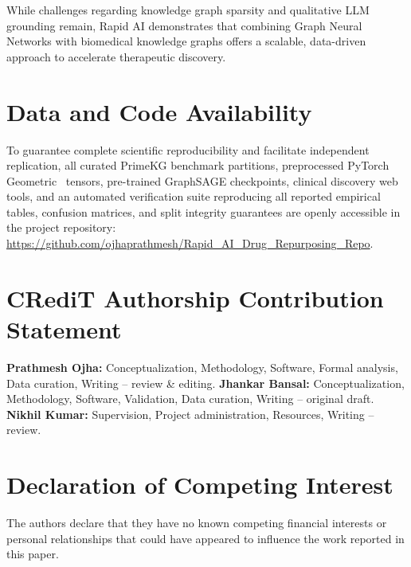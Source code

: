 \documentclass[preprint,12pt]{elsarticle}
\begin{document}
While challenges regarding knowledge graph sparsity and qualitative LLM grounding remain, Rapid AI demonstrates that combining Graph Neural Networks with biomedical knowledge graphs offers a scalable, data-driven approach to accelerate therapeutic discovery.

\section*{Data and Code Availability}
To guarantee complete scientific reproducibility and facilitate independent replication, all curated PrimeKG benchmark partitions, preprocessed PyTorch Geometric~\cite{ref_pyg} tensors, pre-trained GraphSAGE checkpoints, clinical discovery web tools, and an automated verification suite reproducing all reported empirical tables, confusion matrices, and split integrity guarantees are openly accessible in the project repository: \url{https://github.com/ojhaprathmesh/Rapid_AI_Drug_Repurposing_Repo}.

\section*{CRediT Authorship Contribution Statement}
\textbf{Prathmesh Ojha:} Conceptualization, Methodology, Software, Formal analysis, Data curation, Writing -- review \& editing. 
\textbf{Jhankar Bansal:} Conceptualization, Methodology, Software, Validation, Data curation, Writing -- original draft. 
\textbf{Nikhil Kumar:} Supervision, Project administration, Resources, Writing -- review.

\section*{Declaration of Competing Interest}
The authors declare that they have no known competing financial interests or personal relationships that could have appeared to influence the work reported in this paper.
\end{document}
